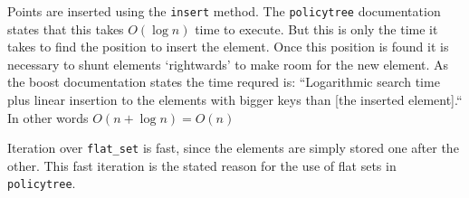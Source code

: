 \documentclass{article}
\newcommand{\policytree}{\texttt{policytree}}
\begin{document}
Points are inserted using the \texttt{insert} method. The
\policytree{} documentation states that this takes $O(\log n)$ time to
execute. But this is only the time it takes to find the position to
insert the element. Once this position is found it is necessary to
shunt elements `rightwards' to make room for the new element. As the
boost documentation states the time requred is: ``Logarithmic search
time plus linear insertion to the elements with bigger keys than [the
inserted element].`` In other words $O(n + \log n) = O(n)$

Iteration over \texttt{flat\_set} is fast, since the elements are
simply stored one after the other. This fast iteration is the stated
reason for the use of flat sets in \policytree.
\end{document}

